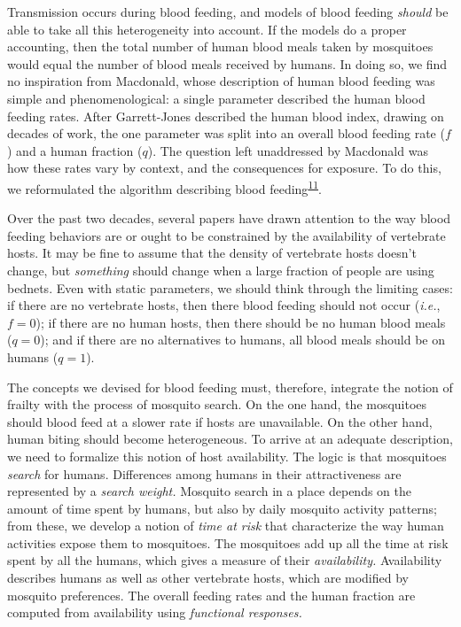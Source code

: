 \documentclass[
]{book}
\begin{document}
Transmission occurs during blood feeding, and models of blood feeding \emph{should} be able to take all this heterogeneity into account. If the models do a proper accounting, then the total number of human blood meals taken by mosquitoes would equal the number of blood meals received by humans. In doing so, we find no inspiration from Macdonald, whose description of human blood feeding was simple and phenomenological: a single parameter described the human blood feeding rates. After Garrett-Jones described the human blood index, drawing on decades of work, the one parameter was split into an overall blood feeding rate (\(f\)) and a human fraction (\(q\)). The question left unaddressed by Macdonald was how these rates vary by context, and the consequences for exposure. To do this, we reformulated the algorithm describing blood feeding\textsuperscript{\protect\hyperlink{ref-WuSL2023SpatialDynamics}{11}}.

Over the past two decades, several papers have drawn attention to the way blood feeding behaviors are or ought to be constrained by the availability of vertebrate hosts. It may be fine to assume that the density of vertebrate hosts doesn't change, but \emph{something} should change when a large fraction of people are using bednets. Even with static parameters, we should think through the limiting cases: if there are no vertebrate hosts, then there blood feeding should not occur (\emph{i.e.}, \(f=0\)); if there are no human hosts, then there should be no human blood meals (\(q=0\)); and if there are no alternatives to humans, all blood meals should be on humans (\(q=1\)).

The concepts we devised for blood feeding must, therefore, integrate the notion of frailty with the process of mosquito search. On the one hand, the mosquitoes should blood feed at a slower rate if hosts are unavailable. On the other hand, human biting should become heterogeneous. To arrive at an adequate description, we need to formalize this notion of host availability.
The logic is that mosquitoes \emph{search} for humans. Differences among humans in their attractiveness are represented by a \emph{search weight.} Mosquito search in a place depends on the amount of time spent by humans, but also by daily mosquito activity patterns; from these, we develop a notion of \emph{time at risk} that characterize the way human activities expose them to mosquitoes. The mosquitoes add up all the time at risk spent by all the humans, which gives a measure of their \emph{availability.} Availability describes humans as well as other vertebrate hosts, which are modified by mosquito preferences. The overall feeding rates and the human fraction are computed from availability using \emph{functional responses.}
\end{document}

